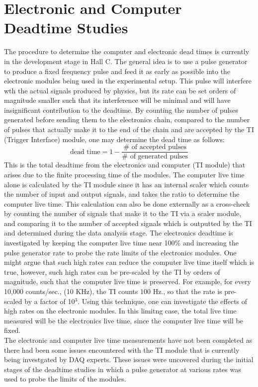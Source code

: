 \documentclass[letterpaper, 10 pt, conference]{ieeeconf}  %
\begin{document}
\section{Electronic and Computer Deadtime Studies}
The procedure to determine the computer and electronic dead times is currently in the development stage in Hall C. The general idea is to use a pulse generator to produce
a fixed frequency pulse and feed it as early as possible into the electronic modules being used in the experimental setup. This pulse will interfere wth the actual signals
produced by physics, but its rate can be set orders of magnitude smaller such that its interference will be minimal and will have insignificant contribution to the deadtime.
By counting the number of pulses generated before sending them to the electronics chain, compared to the number of pulses that actually make it to the end of the chain and
are accepted by the TI (Trigger Interface) module, one may determine the dead time as follows:
\begin{equation}
  \text{dead time} = 1 - \frac{\# \text{ of accepted pulses}}{\# \text{ of generated pulses}}
\end{equation}
This is the total deadtime from the electronics and computer (TI module) that arises due to the finite processing time of the modules. The computer live time alone is calculated by the TI module since it has an
internal scaler which counts the number of input and output signals, and takes the ratio to determine the computer live time. This calculation can also be done externally as a cross-check by counting the number of signals that make it to the
TI via a scaler module, and comparing it to the number of accepted signals which is outputted by the TI and determined during the data analysis stage. The electronics deadtime is investigated by keeping the computer live time near 100$\%$ and
increasing the pulse generator rate to probe the rate limits of the electronics modules. One might argue that such high rates can reduce the computer live time itself which is true, however, such high rates can be pre-scaled by the TI by orders
of magnitude, such that the computer live time is preserved. For example, for every 10,000 counts/sec., (10 KHz), the TI counts 100 Hz., so that the rate is pre-scaled by a factor of 10$^{3}$. Using this technique, one can investigate the
effects of high rates on the electronic modules. In this limitng case, the total live time measured will be the electronics live time, since the computer live time will be fixed. \\
\indent The electronic and computer live time measurements have not been completed as there had been some issues encountered with the TI module that is currently being investgated by DAQ experts. These issues were uncovered during the
initial stages of the deadtime studies in which a pulse generator at various rates was used to probe the limits of the modules. 
\end{document}
